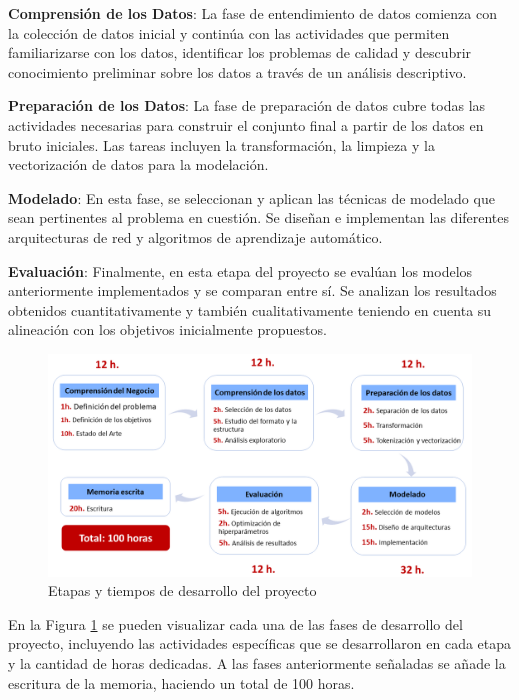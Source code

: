 \textbf{Comprensión de los Datos}: La fase de entendimiento de datos comienza con la colección de datos inicial y continúa con las actividades que permiten familiarizarse con los datos, identificar los problemas de calidad y descubrir conocimiento preliminar sobre los datos a través de un análisis descriptivo.

\textbf{Preparación de los Datos}: La fase de preparación de datos cubre todas las actividades necesarias para construir el conjunto final a partir de los datos en bruto iniciales. Las tareas incluyen la transformación, la limpieza y la vectorización de datos para la modelación.

\textbf{Modelado}: En esta fase, se seleccionan y aplican las técnicas de modelado que sean pertinentes al problema en cuestión. Se diseñan e implementan las diferentes arquitecturas de red y algoritmos de aprendizaje automático.

\textbf{Evaluación}: Finalmente, en esta etapa del proyecto se evalúan los modelos anteriormente implementados y se comparan entre sí. Se analizan los resultados obtenidos cuantitativamente y también cualitativamente teniendo en cuenta su alineación con los objetivos inicialmente propuestos.

\begin{figure}[!tb]
  \begin{center}
    \includegraphics[angle=0, width=1\textwidth]{Graphics/crisp.png}
  \end{center}
    \caption{Etapas y tiempos de desarrollo del proyecto}\label{crisp}
\end{figure}

En la Figura \ref{crisp} se pueden visualizar cada una de las fases de desarrollo del proyecto, incluyendo las actividades específicas que se desarrollaron en cada etapa y la cantidad de horas dedicadas. A las fases anteriormente señaladas se añade la escritura de la memoria, haciendo un total de 100 horas.

